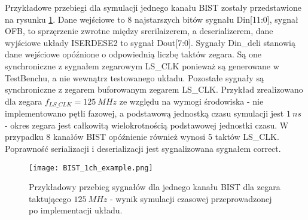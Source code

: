             Przykładowe przebiegi dla symulacji jednego kanału BIST zostały przedstawione na rysunku \ref{fig:BIST_1ch_example}. 
            Dane wejściowe to 8 najstarszych bitów sygnału Din[11:0], sygnał OFB, to sprzęrzenie zwrotne między srerilaizerem, a 
            deserializerem, dane wyjściowe układy ISERDESE2 to sygnał Dout[7:0]. Sygnały Din\_deli stanowią dane wejściowe opóźnione o 
            odpowiednią liczbę taktów zegara. Są one synchroniczne z sygnałem zegarowym LS\_CLK ponieważ są generowane w TestBenchu, 
            a nie wewnątrz testowanego układu. Pozostałe sygnały są synchroniczne z zegarem buforowanym zegarem LS\_CLK. Przykład zrealizowano 
            dla zegara $f_{LS\_CLK} = 125 \ MHz$ ze względu na wymogi środowiska - nie implementowano pętli fazowej, a podstawową jednostką 
            czasu symulacji jest $1 \ ns$ - okres zegara jest całkowitą wielokrotnością podstawowej jednostki czasu. W przypadku 8 kanałów 
            BIST opóźnienie również wynosi 5 taktów LS\_CLK. Poprawność serializacji i deserializacji jest sygnalizowana sygnałem correct. 
            \begin{figure}[!ht]
                \centering
                \texttt{[image: BIST\_1ch\_example.png]}
                \caption{Przykładowy przebieg sygnałów dla jednego kanału BIST dla zegara taktującego $125 \ MHz$ - wynik symulacji czasowej przeprowadzonej po implementacji układu.}
                \label{fig:BIST_1ch_example}
            \end{figure}

